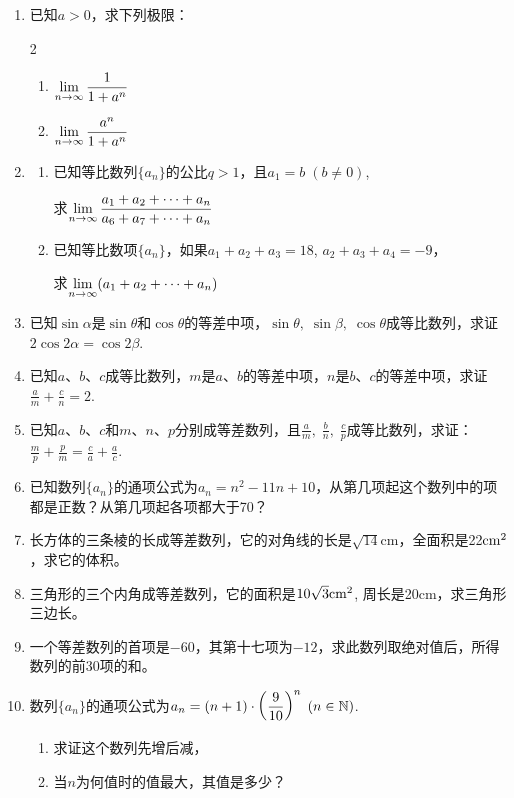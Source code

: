 \begin{enumerate}
\item 已知$a>0$，求下列极限：
\begin{multicols}{2}
\begin{enumerate}[(1)]
    \item $\lim\limits_{n\to \infty}\dfrac{1}{1+a^n}$
    \item $\lim\limits_{n\to \infty}\dfrac{a^n}{1+a^n}$
\end{enumerate}
\end{multicols}

\item \begin{enumerate}[(1)]
\item 已知等比数列$\{a_n\}$的公比$q>1$，且$a_1=b\; (b\ne 0)$, 

求$\lim\limits_{n\to \infty}\dfrac{a_1+a_2+\cdots+a_n}{a_6+a_7+\cdots+a_n}$
\item 已知等比数项$\{a_n\}$，如果$a_1+a_2+a_3=18$, $a_2+a_3+a_4=-9$，

求$\lim\limits_{n\to \infty}(a_1+a_2+\cdots+a_n)$
\end{enumerate}

\item 已知$\sin\alpha$是$\sin\theta$和$\cos\theta$的等差中项，$\sin\theta,\; \sin\beta,\; \cos\theta$成等比数列，求证$2\cos2\alpha=\cos2\beta$.
\item 已知$a$、$b$、$c$成等比数列，$m$是$a$、$b$的等差中项，$n$是$b$、$c$的等差中项，求证$\frac{a}{m}+\frac{c}{n}=2$.
\item 已知$a$、$b$、$c$和$m$、$n$、$p$分别成等差数列，且$\frac{a}{m},\; \frac{b}{n},\; \frac{c}{p}$成等比数列，求证：$\frac{m}{p}+\frac{p}{m}=\frac{c}{a}+\frac{a}{c}$.

\item 已知数列$\{a_n\}$的通项公式为$a_n=n^2-11n+10$，从第几项起这个数列中的项都是正数？从第几项起各项都大于70？
\item 长方体的三条棱的长成等差数列，它的对角线的长是$\sqrt{14}$cm，全面积是22${\rm cm^2}$，求它的体积。
\item 三角形的三个内角成等差数列，它的面积是$10\sqrt{3}{\rm cm}^2$, 周长是20cm，求三角形三边长。
\item 一个等差数列的首项是$-60$，其第十七项为$-12$，求此数列取绝对值后，所得数列的前30项的和。
\item 数列$\{a_n\}$的通项公式为$a_n=(n+1)\cdot \left(\dfrac{9}{10}\right)^n\; (n\in\mathbb{N})$.
\begin{enumerate}[(1)]
\item 求证这个数列先增后减，
\item 当$n$为何值时的值最大，其值是多少？
\end{enumerate}


\end{enumerate}
